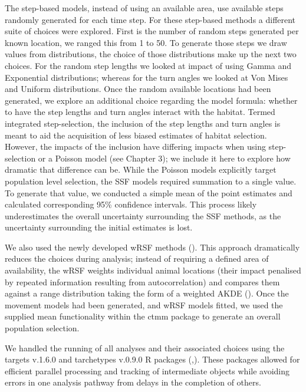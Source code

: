 \documentclass[10pt,a4paper]{article}
\begin{document}
The step-based models, instead of using an available area, use available steps randomly generated for each time step.
For these step-based methods a different suite of choices were explored.
First is the number of random steps generated per known location, we ranged this from 1 to 50.
To generate those steps we draw values from distributions, the choice of those distributions make up the next two choices.
For the random step lengths we looked at impact of using Gamma and Exponential distributions; whereas for the turn angles we looked at Von Mises and Uniform distributions.
Once the random available locations had been generated, we explore an additional choice regarding the model formula: whether to have the step lengths and turn angles interact with the habitat.
Termed integrated step-selection, the inclusion of the step lengths and turn angles is meant to aid the acquisition of less biased estimates of habitat selection.
However, the impacts of the inclusion have differing impacts when using step-selection or a Poisson model (see Chapter 3); we include it here to explore how dramatic that difference can be.
While the Poisson models explicitly target population level selection, the SSF models required summation to a single value.
To generate that value, we conducted a simple mean of the point estimates and calculated corresponding 95\% confidence intervals.
This process likely underestimates the overall uncertainty surrounding the SSF methods, as the uncertainty surrounding the initial estimates is lost.

We also used the newly developed wRSF methods ().
This approach dramatically reduces the choices during analysis; instead of requiring a defined area of availability, the wRSF weights individual animal locations (their impact penalised by repeated information resulting from autocorrelation) and compares them against a range distribution taking the form of a weighted AKDE ().
Once the movement models had been generated, and wRSF models fitted, we used the supplied mean functionality within the ctmm package to generate an overall population selection.

We handled the running of all analyses and their associated choices using the targets v.1.6.0 and tarchetypes v.0.9.0 R packages (,).
These packages allowed for efficient parallel processing and tracking of intermediate objects while avoiding errors in one analysis pathway from delays in the completion of others.
\end{document}
